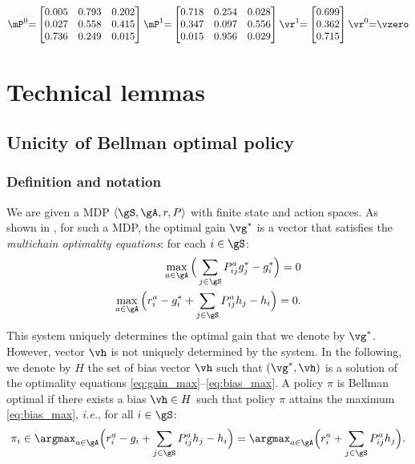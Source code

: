 \begin{equation*}
    \mP^0{=}\begin{bmatrix}
        0.005 & 0.793 & 0.202 \\
        0.027 & 0.558 & 0.415 \\
        0.736 & 0.249 & 0.015
    \end{bmatrix}
    \mP^1{=}\begin{bmatrix}
        0.718 & 0.254 & 0.028 \\
        0.347 & 0.097 & 0.556 \\
        0.015 & 0.956 & 0.029
    \end{bmatrix}
    \vr^1{=}\begin{bmatrix}
        0.699 \\
        0.362 \\
        0.715
    \end{bmatrix} \vr^0{=}\vzero
\end{equation*}

\section{Technical lemmas}

\subsection{Unicity of Bellman optimal policy}
\label{apx:unicity_BO}

\subsubsection{Definition and notation}

We are given a MDP $\langle\gS,\gA,r,P\rangle$ with finite state and action spaces.
As shown in \cite[Chapter~9]{puterman2014markov}, for such a MDP, the optimal gain $\vg^*$ is a vector that satisfies the \emph{multichain optimality equations}: for each $i\in\gS$:
\begin{align}
    \max_{a\in\gA}{\Big(\sum_{j\in\gS}P^a_{ij}g^*_j-g^*_i\Big)} =0 \label{eq:gain_max}\\
    \max_{a\in\gA}{\Big(r^a_i -g^*_i +\sum_{j\in\gS}P^a_{ij}h_j-h_i\Big)} =0. \label{eq:bias_max}
\end{align}
This system uniquely determines the optimal gain that we denote by $\vg^*$.
However, vector $\vh$ is not uniquely determined by the system.
In the following, we denote by $H$ the set of bias vector $\vh$ such that $(\vg^*,\vh)$ is a solution of the optimality equations \eqref{eq:gain_max}--\eqref{eq:bias_max}. A policy $\pi$ is Bellman optimal if there exists a bias $\vh\in H$ such that policy $\pi$ attains the maximum \eqref{eq:bias_max}, \emph{i.e.}, for all $i\in\gS$:
\begin{align*}
    \pi_i \in \argmax_{a\in\gA}{\Big(r^a_i -g_i +\sum_{j\in\gS}P^a_{ij}h_j-h_i\Big)} = \argmax_{a\in\gA}{\Big(r^a_i +\sum_{j\in\gS}P^a_{ij}h_j\Big)}.
\end{align*}

